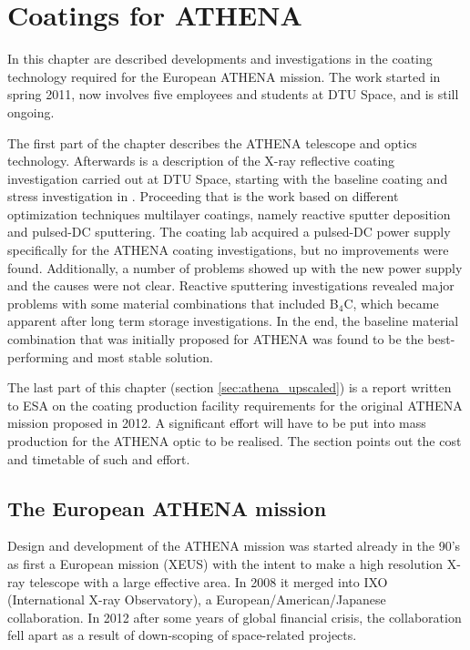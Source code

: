 \chapter{Coatings for ATHENA}\label{chap:athena_coatings}
In this chapter are described developments and investigations in the coating technology required for the European ATHENA mission. The work started in spring 2011, now involves five employees and students at DTU Space, and is still ongoing.

The first part of the chapter describes the ATHENA telescope and optics technology. Afterwards is a description of the X-ray reflective coating investigation carried out at DTU Space, starting with the baseline coating and stress investigation in \cite{Jakobsen:2011vd}. Proceeding that is the work based on different optimization techniques multilayer coatings, namely reactive sputter deposition and pulsed-DC sputtering. The coating lab acquired a pulsed-DC power supply specifically for the ATHENA coating investigations, but no improvements were found. Additionally, a number of problems showed up with the new power supply and the causes were not clear. Reactive sputtering investigations revealed major problems with some material combinations that included B$_4$C, which became apparent after long term storage investigations. In the end, the baseline material combination that was initially proposed for ATHENA was found to be the best-performing and most stable solution.

The last part of this chapter (section \ref{sec:athena_upscaled}) is a report written to ESA on the coating production facility requirements for the original ATHENA mission proposed in 2012. A significant effort will have to be put into mass production for the ATHENA optic to be realised. The section points out the cost and timetable of such and effort.

\section{The European ATHENA mission}
Design and development of the ATHENA mission was started already in the 90's as first a European mission (XEUS) with the intent to make a high resolution X-ray telescope with a large effective area. In 2008 it merged into IXO (International X-ray Observatory), a European/American/Japanese collaboration. In 2012 after some years of global financial crisis, the collaboration fell apart as a result of down-scoping of space-related projects.

